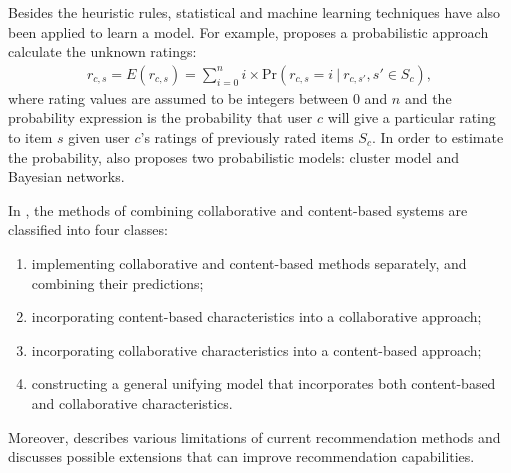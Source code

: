 \documentclass[letterpaper,twocolumn,10pt]{article}
\begin{document}
Besides the heuristic rules,  statistical and machine learning techniques have also  been applied to  learn a model. For example, \cite{BHK98} proposes a probabilistic approach calculate the unknown ratings:
\begin{align} \label{prob}
r_{c, s} = E(r_{c, s}) = \sum_{i=0}^n i\times \text{Pr}(r_{c, s} =i\ |\ r_{c, s'}, s'\in S_c ), 
\end{align}
where rating values are assumed to be integers between  0 and $n$ and the probability expression is the probability that user $c$ will give a particular rating to item $s$ given user $c$'s ratings of previously rated items $S_c$.  In order to estimate  the probability, \cite{BHK98} also proposes two  probabilistic models: cluster model and Bayesian networks.  

In \cite{AT05}, the methods of combining  collaborative and content-based systems are classified into four classes:
\begin{enumerate}
\item implementing collaborative and content-based methods separately, and combining their predictions;
\item incorporating content-based characteristics into a collaborative approach;
\item incorporating collaborative characteristics into a content-based approach;
\item constructing a general unifying model that incorporates both content-based and collaborative characteristics.
\end{enumerate}

Moreover, \cite{AT05}  describes various limitations of current recommendation methods and discusses possible extensions that can improve recommendation capabilities. 
\end{document}
